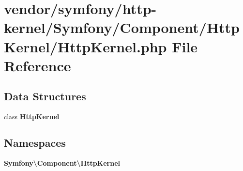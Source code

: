 \section{vendor/symfony/http-\/kernel/\+Symfony/\+Component/\+Http\+Kernel/\+Http\+Kernel.php File Reference}
\label{_http_kernel_8php}
\subsection*{Data Structures}
\begin{DoxyCompactItemize}
\item 
class {\bf Http\+Kernel}
\end{DoxyCompactItemize}
\subsection*{Namespaces}
\begin{DoxyCompactItemize}
\item 
 {\bf Symfony\textbackslash{}\+Component\textbackslash{}\+Http\+Kernel}
\end{DoxyCompactItemize}
